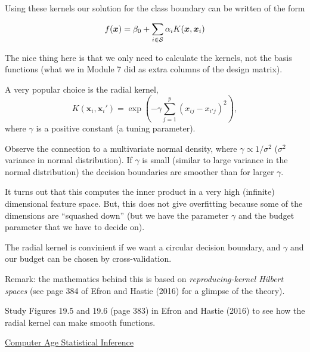 \documentclass[10pt,ignorenonframetext,]{beamer}
\begin{document}
\begin{frame}

Using these kernels our solution for the class boundary can be written
of the form

\[f({\boldsymbol x})=\beta_0 +\sum_{i\in \cal{S}} \alpha_i K({\boldsymbol x},{\boldsymbol x}_i)\]

The nice thing here is that we only need to calculate the kernels, not
the basis functions (what we in Module 7 did as extra columns of the
design matrix).

\end{frame}

\begin{frame}

A very popular choice is the radial kernel, \[
K({\boldsymbol x}_i,{\boldsymbol x}_i')=\exp(-\gamma \sum_{j=1}^p (x_{ij}-x_{i'j})^2),
\] where \(\gamma\) is a positive constant (a tuning parameter).

Observe the connection to a multivariate normal density, where
\(\gamma \propto 1/\sigma^2\) (\(\sigma^2\) variance in normal
distribution). If \(\gamma\) is small (similar to large variance in the
normal distribution) the decision boundaries are smoother than for
larger \(\gamma\).

It turns out that this computes the inner product in a very high
(infinite) dimensional feature space. But, this does not give
overfitting because some of the dimensions are ``squashed down'' (but we
have the parameter \(\gamma\) and the budget parameter that we have to
decide on).

The radial kernel is convinient if we want a circular decision boundary,
and \(\gamma\) and our budget can be chosen by cross-validation.

Remark: the mathematics behind this is based on \emph{reproducing-kernel
Hilbert spaces} (see page 384 of Efron and Hastie (2016) for a glimpse
of the theory).

\end{frame}

\begin{frame}

Study Figures 19.5 and 19.6 (page 383) in Efron and Hastie (2016) to see
how the radial kernel can make smooth functions.

\href{https://web.stanford.edu/~hastie/CASI_files/PDF/casi.pdf}{Computer
Age Statistical Inference}

\end{frame}
\end{document}
